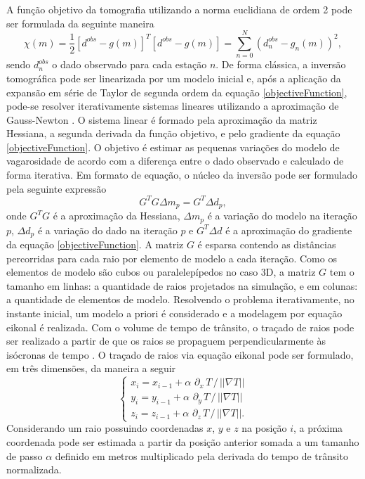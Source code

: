 A função objetivo da tomografia utilizando a norma euclidiana de ordem 2 pode ser formulada da seguinte maneira
\begin{equation}
	\chi(m) = \dfrac{1}{2}\left[d^{obs} - g(m)\right]^T\left[d^{obs} - g(m)\right] = \displaystyle\sum_{n = 0}^N(d^{obs}_n - g_n(m))^2, 
	\label{objectiveFunction}
\end{equation} 
\noindent sendo $d^{obs}_n$ o dado observado para cada estação $n$. De forma clássica, a inversão tomográfica pode ser linearizada por um modelo inicial e, após a aplicação da expansão em série de Taylor de segunda ordem da equação \ref{objectiveFunction}, pode-se resolver iterativamente sistemas lineares utilizando a aproximação de Gauss-Newton \cite{tarantola2005inverse, menke2018geophysical, aster2018parameter}. O sistema linear é formado pela aproximação da matriz Hessiana, a segunda derivada da função objetivo, e pelo gradiente da equação \ref{objectiveFunction}. O objetivo é estimar as pequenas variações do modelo de vagarosidade de acordo com a diferença entre o dado observado e calculado de forma iterativa. Em formato de equação, o núcleo da inversão pode ser formulado pela seguinte expressão 
\begin{equation}
	G^TG \Delta m_p = G^T\Delta d_p, 		
	\label{linearSystem}
\end{equation} 
\noindent onde $G^TG$ é a aproximação da Hessiana, $\Delta m_p$ é a variação do modelo na iteração $p$, $\Delta d_p$ é a variação do dado na iteração $p$ e $G^T\Delta d$ é a aproximação do gradiente da equação \ref{objectiveFunction}. A matriz $G$ é esparsa contendo as distâncias percorridas para cada raio por elemento de modelo a cada iteração. Como os elementos de modelo são cubos ou paralelepípedos no caso 3D, a matriz $G$ tem o tamanho em linhas: a quantidade de raios projetados na simulação, e em colunas: a quantidade de elementos de modelo. Resolvendo o problema iterativamente, no instante inicial, um modelo a priori é considerado e a modelagem por equação eikonal é realizada. Com o volume de tempo de trânsito, o traçado de raios pode ser realizado a partir de que os raios se propaguem perpendicularmente às isócronas de tempo \cite{vidale1988finite}. O traçado de raios via equação eikonal pode ser formulado, em três dimensões, da maneira a seguir
\begin{equation}
	\begin{cases}
		x_i = x_{i-1} + \alpha\,\, \partial_x\, T \,/\, ||\nabla T|| \\ 
		y_i = y_{i-1} + \alpha\,\, \partial_y\, T \,/\, ||\nabla T|| \\ 
		z_i = z_{i-1} + \alpha\,\, \partial_z\, T \,/\, ||\nabla T||. 
	\end{cases}
	\label{rayTracing}
\end{equation}
\noindent Considerando um raio possuindo coordenadas $x$, $y$ e $z$ na posição $i$, a próxima coordenada pode ser estimada a partir da posição anterior somada a um tamanho de passo $\alpha$ definido em metros multiplicado pela derivada do tempo de trânsito normalizada.  

